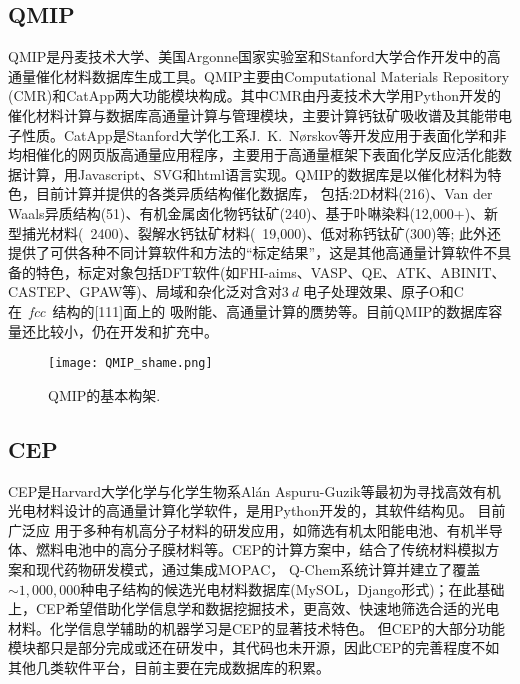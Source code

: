 \subsection{\rm{QMIP}}
\textrm{QMIP}是丹麦技术大学、美国\textrm{Argonne}国家实验室和\textrm{Stanford}大学合作开发中的高通量催化材料数据库生成工具\cite{QMIP_URL}。\textrm{QMIP}主要由\textrm{Computational Materials Repository (CMR)}和\textrm{CatApp}两大功能模块构成。其中\textrm{CMR}由丹麦技术大学用\textrm{Python}开发的催化材料计算与数据库高通量计算与管理模块\cite{CMR_URL}，主要计算钙钛矿吸收谱及其能带电子性质。\textrm{CatApp}是\textrm{Stanford}大学化工系\textrm{J.~K.~N{\o}rskov}等开发应用于表面化学和非均相催化的网页版高通量应用程序\cite{ACIE51-272_2012}，主要用于高通量框架下表面化学反应活化能数据计算，用\textrm{Javascript}、\textrm{SVG}和\textrm{html}语言实现。\textrm{QMIP}的数据库是以催化材料为特色，目前计算并提供的各类异质结构催化数据库， 包括:\textrm{2D}材料(216)、\textrm{Van der Waals}异质结构(51)、有机金属卤化物钙钛矿(240)、基于卟啉染料(12,000+)、新型捕光材料(~2400)、裂解水钙钛矿材料(~19,000)、低对称钙钛矿(300)等; 此外还提供了可供各种不同计算软件和方法的“标定结果”，这是其他高通量计算软件不具备的特色，标定对象包括\textrm{DFT}软件(如\textrm{FHI-aims}\cite{CPC180-2175_2009}、VASP、QE、ATK、ABINIT、CASTEP\cite{ZFK220-567_2005}、GPAW\cite{JPCM22-253202_2010}等)、局域和杂化泛对含对3\,\textit{d} 电子处理效果、原子\textrm{O}和\textrm{C}在~\textit{fcc}~结构的[111]面上的 吸附能、高通量计算的赝势等。目前\textrm{QMIP}的数据库容量还比较小，仍在开发和扩充中。
\begin{figure}[h!]
\centering
\texttt{[image: QMIP\_shame.png]}%
\caption{\textrm{QMIP}的基本构架.}%
\label{Auto_Flow_Platform-3}
\end{figure}

\subsection{\rm{CEP}}
\textrm{CEP}是\textrm{Harvard}大学化学与化学生物系\textrm{Al{\'a}n Aspuru-Guzik}等最初为寻找高效有机光电材料设计的高通量计算化学软件\cite{JPCL2-2241_2011}，是用\textrm{Python}开发的，其软件结构见。
目前广泛应 用于多种有机高分子材料的研发应用，如筛选有机太阳能电池、有机半导体、燃料电池中的高分子膜材料等。\textrm{CEP}的计算方案中，结合了传统材料模拟方案和现代药物研发模式，通过集成\textrm{MOPAC}\cite{JCAMD4-1-1990}， \textrm{Q-Chem}\cite{PCCP8-3172_2006}系统计算并建立了覆盖$\sim1,000,000$种电子结构的候选光电材料数据库(\textrm{MySOL}，\textrm{Django}形式)；在此基础上，\textrm{CEP}希望借助化学信息学和数据挖掘技术，更高效、快速地筛选合适的光电材料。化学信息学辅助的机器学习是\textrm{CEP}的显著技术特色。 但\textrm{CEP}的大部分功能模块都只是部分完成或还在研发中，其代码也未开源，因此\textrm{CEP}的完善程度不如其他几类软件平台，目前主要在完成数据库的积累。 

